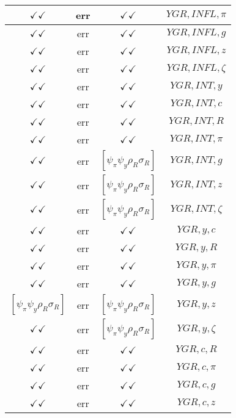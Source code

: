 \documentclass[a4paper,10pt]{article}
\begin{document}
\begin{longtable}{|c|c|c|c|}
\hline
$\checkmark\checkmark$ & err & $\checkmark\checkmark$ & ${YGR},{INFL},{\pi}$ \\
\hline
$\checkmark\checkmark$ & err & $\checkmark\checkmark$ & ${YGR},{INFL},{g}$ \\
\hline
$\checkmark\checkmark$ & err & $\checkmark\checkmark$ & ${YGR},{INFL},{z}$ \\
\hline
$\checkmark\checkmark$ & err & $\checkmark\checkmark$ & ${YGR},{INFL},{\zeta}$ \\
\hline
$\checkmark\checkmark$ & err & $\checkmark\checkmark$ & ${YGR},{INT},{y}$ \\
\hline
$\checkmark\checkmark$ & err & $\checkmark\checkmark$ & ${YGR},{INT},{c}$ \\
\hline
$\checkmark\checkmark$ & err & $\checkmark\checkmark$ & ${YGR},{INT},{R}$ \\
\hline
$\checkmark\checkmark$ & err & $\checkmark\checkmark$ & ${YGR},{INT},{\pi}$ \\
\hline
$\checkmark\checkmark$ & err & $[\psi_\pi \psi_y \rho_R \sigma_R ]$ & ${YGR},{INT},{g}$ \\
\hline
$\checkmark\checkmark$ & err & $[\psi_\pi \psi_y \rho_R \sigma_R ]$ & ${YGR},{INT},{z}$ \\
\hline
$\checkmark\checkmark$ & err & $[\psi_\pi \psi_y \rho_R \sigma_R ]$ & ${YGR},{INT},{\zeta}$ \\
\hline
$\checkmark\checkmark$ & err & $\checkmark\checkmark$ & ${YGR},{y},{c}$ \\
\hline
$\checkmark\checkmark$ & err & $\checkmark\checkmark$ & ${YGR},{y},{R}$ \\
\hline
$\checkmark\checkmark$ & err & $\checkmark\checkmark$ & ${YGR},{y},{\pi}$ \\
\hline
$\checkmark\checkmark$ & err & $\checkmark\checkmark$ & ${YGR},{y},{g}$ \\
\hline
$[\psi_\pi \psi_y \rho_R \sigma_R ]$ & err & $[\psi_\pi \psi_y \rho_R \sigma_R ]$ & ${YGR},{y},{z}$ \\
\hline
$\checkmark\checkmark$ & err & $[\psi_\pi \psi_y \rho_R \sigma_R ]$ & ${YGR},{y},{\zeta}$ \\
\hline
$\checkmark\checkmark$ & err & $\checkmark\checkmark$ & ${YGR},{c},{R}$ \\
\hline
$\checkmark\checkmark$ & err & $\checkmark\checkmark$ & ${YGR},{c},{\pi}$ \\
\hline
$\checkmark\checkmark$ & err & $\checkmark\checkmark$ & ${YGR},{c},{g}$ \\
\hline
$\checkmark\checkmark$ & err & $\checkmark\checkmark$ & ${YGR},{c},{z}$ \\

\end{longtable}
\end{document}

